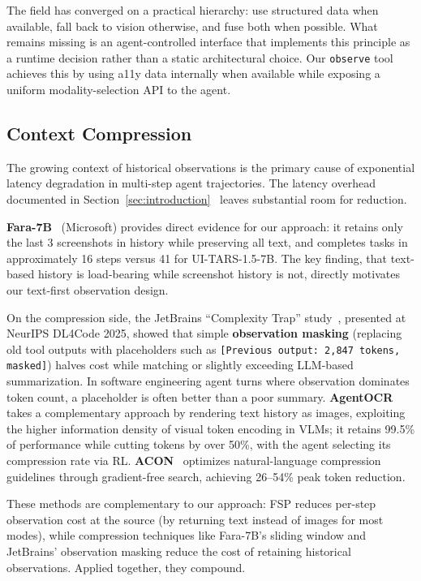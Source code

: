 \documentclass[11pt,a4paper]{article}
\begin{document}
The field has converged on a practical hierarchy: use structured data when available, fall back to vision otherwise, and fuse both when possible. What remains missing is an agent-controlled interface that implements this principle as a runtime decision rather than a static architectural choice. Our \texttt{observe} tool achieves this by using a11y data internally when available while exposing a uniform modality-selection API to the agent.

\subsection{Context Compression}
\label{sec:rw-context-compression}

The growing context of historical observations is the primary cause of exponential latency degradation in multi-step agent trajectories. The latency overhead documented in Section~\ref{sec:introduction}~\cite{osworld-human} leaves substantial room for reduction.

\textbf{Fara-7B}~\cite{fara-7b} (Microsoft) provides direct evidence for our approach: it retains only the last 3 screenshots in history while preserving all text, and completes tasks in approximately 16 steps versus 41 for UI-TARS-1.5-7B. The key finding, that text-based history is load-bearing while screenshot history is not, directly motivates our text-first observation design.

On the compression side, the JetBrains ``Complexity Trap'' study~\cite{jetbrains-complexity-trap}, presented at NeurIPS DL4Code 2025, showed that simple \textbf{observation masking} (replacing old tool outputs with placeholders such as \texttt{[Previous output: 2,847 tokens, masked]}) halves cost while matching or slightly exceeding LLM-based summarization. In software engineering agent turns where observation dominates token count, a placeholder is often better than a poor summary. \textbf{AgentOCR}~\cite{agent-ocr} takes a complementary approach by rendering text history as images, exploiting the higher information density of visual token encoding in VLMs; it retains 99.5\% of performance while cutting tokens by over 50\%, with the agent selecting its compression rate via RL. \textbf{ACON}~\cite{acon} optimizes natural-language compression guidelines through gradient-free search, achieving 26--54\% peak token reduction.

These methods are complementary to our approach: FSP reduces per-step observation cost at the source (by returning text instead of images for most modes), while compression techniques like Fara-7B's sliding window and JetBrains' observation masking reduce the cost of retaining historical observations. Applied together, they compound.
\end{document}
